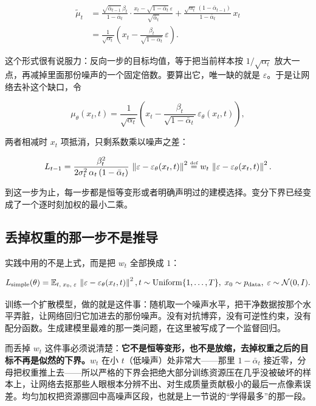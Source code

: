 \[
\begin{aligned}
\tilde\mu_t
&= \frac{\sqrt{\bar\alpha_{t-1}}\,\beta_t}{1-\bar\alpha_t}\cdot\frac{x_t-\sqrt{1-\bar\alpha_t}\,\varepsilon}{\sqrt{\bar\alpha_t}}
 + \frac{\sqrt{\alpha_t}\,(1-\bar\alpha_{t-1})}{1-\bar\alpha_t}\,x_t\\[2pt]
&= \frac{1}{\sqrt{\alpha_t}}\left(x_t-\frac{\beta_t}{\sqrt{1-\bar\alpha_t}}\,\varepsilon\right).
\end{aligned}
\]

这个形式很有说服力：反向一步的目标均值，等于把当前样本按 \(1/\sqrt{\alpha_t}\) 放大一点，再减掉里面那份噪声的一个固定倍数。要算出它，唯一缺的就是 \(\varepsilon\)。于是让网络去补这个缺口，令

\[
\mu_\theta(x_t,t)=\frac{1}{\sqrt{\alpha_t}}\left(x_t-\frac{\beta_t}{\sqrt{1-\bar\alpha_t}}\,\varepsilon_\theta(x_t,t)\right),
\]

两者相减时 \(x_t\) 项抵消，只剩系数乘以噪声之差：

\[
L_{t-1} = \frac{\beta_t^{2}}{2\sigma_t^{2}\,\alpha_t\,(1-\bar\alpha_t)}\,
\left\lVert\varepsilon-\varepsilon_\theta(x_t,t)\right\rVert^{2}
\stackrel{\text{\tiny def}}{=} w_t\,\left\lVert\varepsilon-\varepsilon_\theta(x_t,t)\right\rVert^{2}.
\]

到这一步为止，每一步都是恒等变形或者明确声明过的建模选择。变分下界已经变成了一个逐时刻加权的最小二乘。

\subsection{丢掉权重的那一步不是推导}

实践中用的不是上式，而是把 \(w_t\) 全部换成 \(1\)：

\[
L_{\mathrm{simple}}(\theta)=
\mathbb{E}_{t,\;x_0,\;\varepsilon}\,
\left\lVert\varepsilon-\varepsilon_\theta(x_t,t)\right\rVert^{2},
\space
t\sim\operatorname{Uniform}\{1,\dots,T\},\;
x_0\sim p_{\mathrm{data}},\;
\varepsilon\sim\mathcal N(0,I).
\]

训练一个扩散模型，做的就是这件事：随机取一个噪声水平，把干净数据按那个水平弄脏，让网络回归它加进去的那份噪声。没有对抗博弈，没有可逆性约束，没有配分函数。生成建模里最难的那一类问题，在这里被写成了一个监督回归。

而丢掉 \(w_t\) 这件事必须说清楚：\textbf{它不是恒等变形，也不是放缩，去掉权重之后的目标不再是似然的下界。}\(w_t\) 在小 \(t\)（低噪声）处非常大——那里 \(1-\bar\alpha_t\) 接近零，分母把权重推上去——所以严格的下界会把绝大部分训练资源压在几乎没被破坏的样本上，让网络去抠那些人眼根本分辨不出、对生成质量贡献极小的最后一点像素误差。均匀加权把资源挪回中高噪声区段，也就是上一节说的``学得最多''的那一段。

